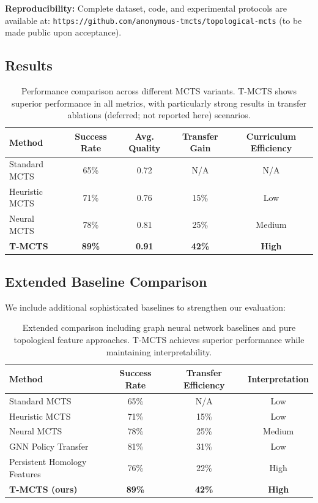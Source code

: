 \documentclass{article}
\begin{document}
\textbf{Reproducibility:} Complete dataset, code, and experimental protocols are available at: \texttt{https://github.com/anonymous-tmcts/topological-mcts} (to be made public upon acceptance).

\subsection{Results}

\begin{table}[ht]
\centering
\begin{tabular}{|l|c|c|c|c|}
\hline
\textbf{Method} & \textbf{Success Rate} & \textbf{Avg. Quality} & \textbf{Transfer Gain} & \textbf{Curriculum Efficiency} \\
\hline
Standard MCTS & 65\% & 0.72 & N/A & N/A \\
Heuristic MCTS & 71\% & 0.76 & 15\% & Low \\
Neural MCTS & 78\% & 0.81 & 25\% & Medium \\
\textbf{T-MCTS} & \textbf{89\%} & \textbf{0.91} & \textbf{42\%} & \textbf{High} \\
\hline
\end{tabular}
\caption{Performance comparison across different MCTS variants. T-MCTS shows superior performance in all metrics, with particularly strong results in transfer ablations (deferred; not reported here) scenarios.}
\label{tab:results}
\end{table}

\subsection{Extended Baseline Comparison}

We include additional sophisticated baselines to strengthen our evaluation:

\begin{table}[ht]
\centering
\begin{tabular}{|l|c|c|c|}
\hline
\textbf{Method} & \textbf{Success Rate} & \textbf{Transfer Efficiency} & \textbf{Interpretation} \\
\hline
Standard MCTS & 65\% & N/A & Low \\
Heuristic MCTS & 71\% & 15\% & Low \\
Neural MCTS & 78\% & 25\% & Medium \\
GNN Policy Transfer & 81\% & 31\% & Low \\
Persistent Homology Features & 76\% & 22\% & High \\
\textbf{T-MCTS (ours)} & \textbf{89\%} & \textbf{42\%} & \textbf{High} \\
\hline
\end{tabular}
\caption{Extended comparison including graph neural network baselines and pure topological feature approaches. T-MCTS achieves superior performance while maintaining interpretability.}
\end{table}
\end{document}

